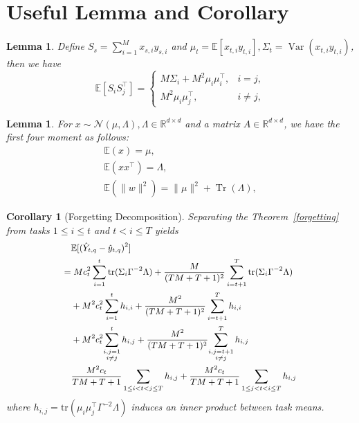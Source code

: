 \documentclass{article}
\theoremstyle{plain}
\newtheorem{lemma}[theorem]{Lemma}
\newtheorem{corollary}[theorem]{Corollary}
\theoremstyle{definition}
\theoremstyle{remark}
\begin{document}
\vspace{-0.1in}\section{Useful Lemma and Corollary}
\label{useful_lemma}
\begin{lemma}
    Define $S_s=\sum_{i=1}^M x_{s,i}y_{s,i}$ and $\mu_t=\mathbb E[x_{t,i}y_{t,i}],\Sigma_t=\operatorname{Var}(x_{t,i}y_{t,i})$, then we have
\[
\mathbb{E}[S_i S_j^\top]
=
\begin{cases}
M\Sigma_i+M^2\mu_i\mu_i^\top,& i=j,\\[4pt]
M^2\mu_i\mu_j^\top,& i\ne j,
\end{cases}
\]
\end{lemma}

\begin{lemma}
    For $x\sim \mathcal{N}(\mu,\Lambda),\Lambda\in \mathbb{R}^{d\times d}$ and a matrix $A\in \mathbb{R}^{d\times d}$, we have the first four moment as follows:
    \begin{align*}
        \mathbb{E}(x) = \mu, \\
        \mathbb{E}(xx^\top) = \Lambda,\\
        \mathbb{E}(\|w\|^2) = \|\mu\|^2 + \operatorname{Tr}(\Lambda),
    \end{align*}
\end{lemma}

\begin{corollary}[Forgetting Decomposition]
\label{d_forgetting}
Separating the Theorem~\ref{forgetting} from tasks $1\le i\le t$ and $t<i\le T$ yields
\[
\small\small
\begin{aligned}
&\mathbb{E}[(\hat{Y}_{t,q}-\hat y_{t,q})^2]\\
=&\;
Mc_t^2\sum_{i=1}^t \mathrm{tr}(\Sigma_i\Gamma^{-2}\Lambda)
+\frac{M}{(TM+T+1)^2}\sum_{i=t+1}^T \mathrm{tr}(\Sigma_i\Gamma^{-2}\Lambda)
\\
&+M^2 c_t^2\sum_{i=1}^t h_{i,i} +\frac{M^2}{(TM+T+1)^2}\sum_{i=t+1}^T h_{i,i}
\\
&+M^2c_t^2\!\sum_{\substack{i,j=1\\i\ne j}}^t 
h_{i,j}
+\frac{M^2}{(TM+T+1)^2}\!
\sum_{\substack{i,j=t+1\\i\ne j}}^Th_{i,j}
\\
&\frac{M^2c_t}{TM+T+1}\sum_{1\le i <t <j\le T}h_{i,j} +\frac{M^2c_t}{TM+T+1}\sum_{1\le j <t <i\le T}h_{i,j}
\end{aligned}
\]
where $h_{i,j} = \mathrm{tr}(\mu_i\mu_j^\top\Gamma^{-2}\Lambda)$ induces an inner product between task means.
\end{corollary}
\end{document}
